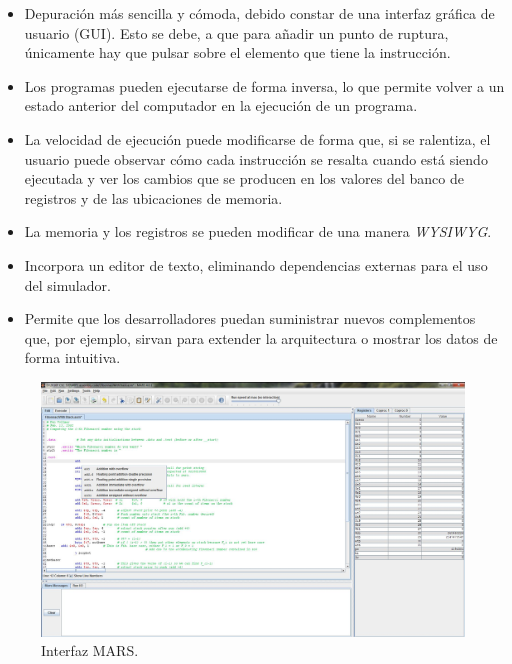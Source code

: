 \begin{itemize}

\item Depuración más sencilla y cómoda, debido constar de una interfaz gráfica de usuario (GUI). Esto se debe, a que para añadir un punto de ruptura, únicamente hay que pulsar sobre el elemento que tiene la instrucción.

\item Los programas pueden ejecutarse de forma inversa, lo que permite volver a un estado anterior del computador en la ejecución de un programa.

\item La velocidad de ejecución puede modificarse de forma que, si se ralentiza, el usuario puede observar cómo cada instrucción se resalta cuando está siendo ejecutada y ver los cambios que se producen en los valores del banco de registros y de las ubicaciones de memoria.

\item  La memoria y los registros se pueden modificar de una manera \emph{WYSIWYG}.

\item Incorpora un editor de texto, eliminando dependencias externas para el uso del simulador.

\item Permite que los desarrolladores puedan suministrar nuevos complementos que, por ejemplo, sirvan para extender la arquitectura o mostrar los datos de forma intuitiva.

\end{itemize}

\begin{figure}[htbp]
 	\centering
 	\includegraphics[width=14cm]{figures/mars_figure}
 	\caption{Interfaz MARS.}
	\label{fig:mars_figure}
\end{figure}

